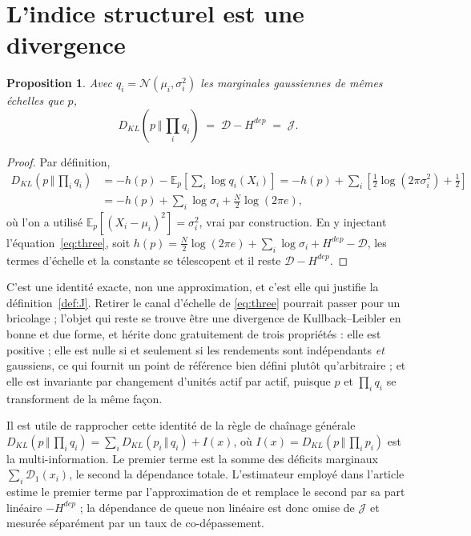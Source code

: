 \documentclass[11pt]{article}
\newtheorem{proposition}{Proposition}
\theoremstyle{definition}
\theoremstyle{remark}
\newcommand{\JJ}{\mathcal{J}}
\newcommand{\DD}{\mathcal{D}}
\newcommand{\Dun}{\mathcal{D}_1}
\newcommand{\KL}[2]{D_{KL}\!\left(#1\,\Vert\,#2\right)}
\begin{document}
\section{L'indice structurel est une divergence}
\label{app:index}

\begin{proposition}
\label{prop:index}
Avec $q_i=\mathcal N(\mu_i,\sigma_i^2)$ les marginales gaussiennes de mêmes
échelles que $p$,
\[
\KL{p}{\textstyle\prod_i q_i} \;=\; \DD - H^{dep} \;=\; \JJ .
\]
\end{proposition}

\begin{proof}
Par définition,
\[
\begin{aligned}
\KL{p}{\textstyle\prod_i q_i} &= -h(p) - \mathbb{E}_p\!\left[\textstyle\sum_i\log q_i(X_i)\right]
= -h(p) + \sum_i\left[\tfrac12\log(2\pi\sigma_i^2)+\tfrac12\right]\\
&= -h(p) + \sum_i\log\sigma_i + \tfrac N2\log(2\pi e),
\end{aligned}
\]
où l'on a utilisé $\mathbb{E}_p[(X_i-\mu_i)^2]=\sigma_i^2$, vrai par
construction. En y injectant l'équation~\eqref{eq:three}, soit
$h(p)=\tfrac N2\log(2\pi e)+\sum_i\log\sigma_i+H^{dep}-\DD$, les termes
d'échelle et la constante se télescopent et il reste $\DD-H^{dep}$.
\end{proof}

C'est une identité exacte, non une approximation, et c'est elle qui justifie la
définition~\ref{def:J}. Retirer le canal d'échelle de \eqref{eq:three} pourrait
passer pour un bricolage ; l'objet qui reste se trouve être une divergence de
Kullback--Leibler en bonne et due forme, et hérite donc gratuitement de trois
propriétés : elle est positive ; elle est nulle si et seulement si les rendements
sont indépendants \emph{et} gaussiens, ce qui fournit un point de référence bien
défini plutôt qu'arbitraire ; et elle est invariante par changement d'unités
actif par actif, puisque $p$ et $\prod_i q_i$ se transforment de la même façon.

Il est utile de rapprocher cette identité de la règle de chaînage générale
$\KL{p}{\prod_i q_i}=\sum_i\KL{p_i}{q_i}+I(x)$, où
$I(x)=\KL{p}{\prod_i p_i}$ est la multi-information. Le premier terme est la
somme des déficits marginaux $\sum_i\Dun(x_i)$, le second la dépendance totale.
L'estimateur employé dans l'article estime le premier terme par l'approximation
de \citet{hyvarinen1998} et remplace le second par sa part linéaire
$-H^{dep}$ ; la dépendance de queue non linéaire est donc omise de $\JJ$ et
mesurée séparément par un taux de co-dépassement.
\end{document}
